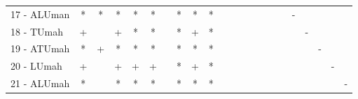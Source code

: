 \begin{table}[h]
\begin{center}
\begin{tabular}{lcc|cc|cc|cc|cc|cc|cc|cc|cc|cc|c}
17 - ALUman	& * & * & * & * & * &   & * & * & * &   &   &   &   &   &   &   & - &   &   &   &   \\
18 - TUmah	& + &   & + & * & * &   & * & + & * &   &   &   &   &   &   &   &   & - &   &   &   \\ \hline
19 - ATUmah	& * & + & * & * & * &   & * & * & * &   &   &   &   &   &   &   &   &   & - &   &   \\
20 - LUmah	& + &   & + & + & + &   & * & + & * &   &   &   &   &   &   &   &   &   &   & - &   \\ \hline
21 - ALUmah	& * &   & * & * & * &   & * & * & * &   &   &   &   &   &   &   &   &   &   &   & - \\\end{tabular}
\label{stratsALCKappaFried5NN}
\end{center}
\end{table}